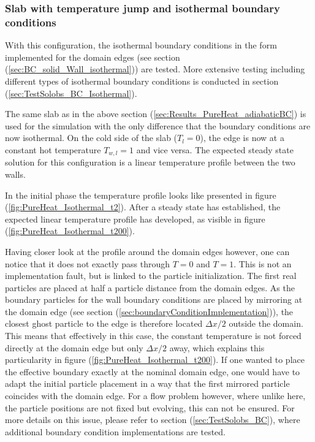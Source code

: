 \documentclass[11pt,a4paper,twoside]{report}
\begin{document}
\subsubsection{Slab with temperature jump and isothermal boundary conditions}
\label{sec:pureHeat_Results_isothermal_slab}

With this configuration, the isothermal boundary conditions in the form implemented for the domain edges (see section (\ref{sec:BC_solid_Wall_isothermal})) are tested. More extensive testing including different types of isothermal boundary conditions is conducted in section (\ref{sec:TestSolobs_BC_Isothermal}).

The same slab as in the above section (\ref{sec:Results_PureHeat_adiabaticBC}) is used for the simulation with the only difference that the boundary conditions are now isothermal. On the cold side of the slab ($T_l=0$), the edge is now at a constant hot temperature $T_{w,l}=1$ and vice versa. The expected steady state solution for this configuration is a linear temperature profile between the two walls.

In the initial phase the temperature profile looks like presented in figure (\ref{fig:PureHeat_Isothermal_t2}). After a steady state has established, the expected linear temperature profile has developed, as visible in figure (\ref{fig:PureHeat_Isothermal_t200}).  

Having closer look at the profile around the domain edges however, one can notice that it does not exactly pass through $T=0$ and $T=1$. This is not an implementation fault, but is linked to the particle initialization. The first real particles are placed at half a particle distance from the domain edges. As the boundary particles for the wall boundary conditions are placed by mirroring at the domain edge (see section (\ref{sec:boundaryConditionImplementation})), the closest ghost particle to the edge is therefore located $\Delta x/2$ outside the domain. This means that effectively in this case, the constant temperature is not forced directly at the domain edge but only $\Delta x/2$ away, which explains this particularity in figure (\ref{fig:PureHeat_Isothermal_t200}). If one wanted to place the effective boundary exactly at the nominal domain edge, one would have to adapt the initial particle placement in a way that the first mirrored particle coincides with the domain edge. For a flow problem however, where unlike here, the particle positions are not fixed but evolving, this can not be ensured.  For more details on this issue, please refer to section (\ref{sec:TestSolobs_BC}), where additional boundary condition implementations are tested.
\end{document}
